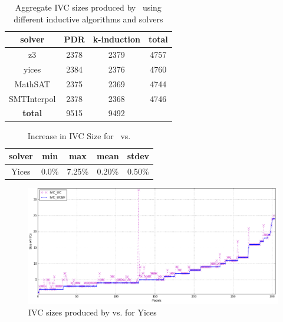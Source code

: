 \begin{table}
  \centering
  \begin{tabular}{ |c|c|c|c| }
    \hline
     solver & PDR & k-induction & \textbf{total} \\
    \hline
      z3 & 2378 & 2379 & 4757 \\
      yices & 2384 & 2376 & 4760 \\
      MathSAT & 2375 & 2369 & 4744 \\
      SMTInterpol & 2378 & 2368 & 4746 \\
    \hline
      \textbf{total} & 9515 & 9492 &   \\
    \hline
  \end{tabular}
  \caption{Aggregate IVC sizes produced by \ucalg\ using different inductive algorithms and solvers}
  \label{tab:minimality-algorithm-solvers}
\end{table}

\begin{table}
  \centering
  \begin{tabular}{ |c||c|c|c|c| }
    \hline
     solver & min & max & mean & stdev \\[0.5ex]
    \hline
    Yices &   0.0\%   & 7.25\% & 0.20\% & 0.50\% \\[0.5ex]
    \hline
  \end{tabular}
  \caption{Increase in IVC Size for \ucalg\ vs. \ucbfalg}
  \label{tab:overhead-ucbfalg}
\end{table}


\begin{figure}
  \centering
  \includegraphics[width=\textwidth]{figs/minimality.png} 
  \caption{IVC sizes produced by \ucalg vs. \ucbfalg for Yices}
  \label{fig:minimality-all}
\end{figure}

